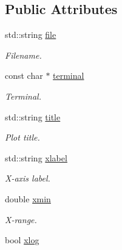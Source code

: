 \subsection*{Public Attributes}
\begin{DoxyCompactItemize}
\item 
\hypertarget{a00431_a4b4e4bd081b2f2b015397f8950a22be8}{}std\+::string \hyperlink{a00431_a4b4e4bd081b2f2b015397f8950a22be8}{file}\label{a00431_a4b4e4bd081b2f2b015397f8950a22be8}

\begin{DoxyCompactList}\small\item\em Filename. \end{DoxyCompactList}\item 
\hypertarget{a00431_abfcca98c98780c4db2691cd60ef7452d}{}const char $\ast$ \hyperlink{a00431_abfcca98c98780c4db2691cd60ef7452d}{terminal}\label{a00431_abfcca98c98780c4db2691cd60ef7452d}

\begin{DoxyCompactList}\small\item\em Terminal. \end{DoxyCompactList}\item 
\hypertarget{a00431_a2c37a761410c3f661c1450aad66a4439}{}std\+::string \hyperlink{a00431_a2c37a761410c3f661c1450aad66a4439}{title}\label{a00431_a2c37a761410c3f661c1450aad66a4439}

\begin{DoxyCompactList}\small\item\em Plot title. \end{DoxyCompactList}\item 
\hypertarget{a00431_aedab4e547a2e928c342ff40bf22a4937}{}std\+::string \hyperlink{a00431_aedab4e547a2e928c342ff40bf22a4937}{xlabel}\label{a00431_aedab4e547a2e928c342ff40bf22a4937}

\begin{DoxyCompactList}\small\item\em X-\/axis label. \end{DoxyCompactList}\item 
\hypertarget{a00431_ac43ef2605d95cd10f504dc1861d078cd}{}double \hyperlink{a00431_ac43ef2605d95cd10f504dc1861d078cd}{xmin}\label{a00431_ac43ef2605d95cd10f504dc1861d078cd}

\begin{DoxyCompactList}\small\item\em X-\/range. \end{DoxyCompactList}\item 
\hypertarget{a00431_afaaddcfa4a3d0331875c2585ab7f2fca}{}bool \hyperlink{a00431_afaaddcfa4a3d0331875c2585ab7f2fca}{xlog}\label{a00431_afaaddcfa4a3d0331875c2585ab7f2fca}


\end{DoxyCompactItemize}
